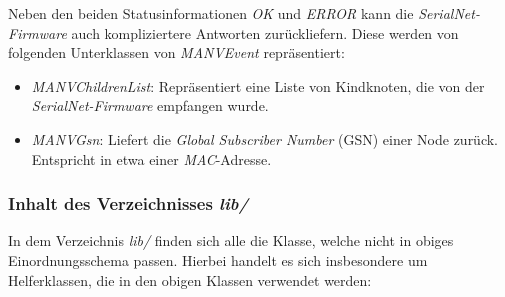    Neben den beiden Statusinformationen \emph{OK} und \emph{ERROR} kann die \emph{SerialNet-Firmware} auch 
    kompliziertere Antworten zurückliefern. Diese werden von folgenden Unterklassen von \emph{MANVEvent} repräsentiert:
        
    \begin{itemize}
        \item{\emph{MANVChildrenList}:} Repräsentiert eine Liste von Kindknoten, die von der \emph{SerialNet-Firmware}
                                 empfangen wurde.
        \item{\emph{MANVGsn}:} Liefert die \emph{Global Subscriber Number} (GSN) einer Node zurück. Entspricht in etwa einer 
                        \emph{MAC}-Adresse.
    \end{itemize}

    \subsubsection{Inhalt des Verzeichnisses \emph{lib/}}

    In dem Verzeichnis \emph{lib/} finden sich alle die Klasse, welche nicht in obiges Einordnungsschema passen. 
    Hierbei handelt es sich insbesondere um Helferklassen, die in den obigen Klassen verwendet werden:

